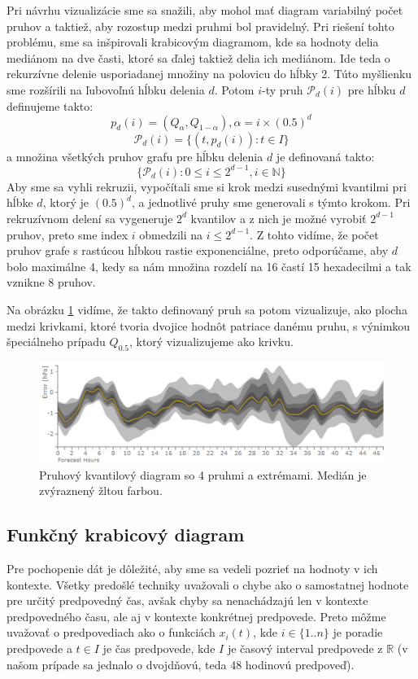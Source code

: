 Pri návrhu vizualizácie sme sa snažili, aby mohol mať diagram variabilný počet pruhov a taktiež, aby rozostup medzi pruhmi bol pravidelný. Pri riešení tohto problému, sme sa inšpirovali krabicovým diagramom, kde sa hodnoty delia mediánom na dve časti, ktoré sa ďalej taktiež delia ich mediánom. Ide teda o rekurzívne delenie usporiadanej množiny na polovicu do hĺbky 2. Túto myšlienku sme rozšírili na ľubovoľnú hĺbku delenia $ d $. Potom $ i $-ty pruh $ \mathcal{P}_{d}(i) $ pre hĺbku $ d $ definujeme takto:
\[
	p_{d}(i) = (Q_{\alpha},Q_{1 - \alpha}) , \alpha = i \times (0.5)^d 	
\]
\[
	\mathcal{P}_{d}(i) = \{ (t,p_{d}(i)) : t \in I \}
\]
a množina všetkých pruhov grafu pre hĺbku delenia $ d $ je definovaná takto:
\[
	\{ \mathcal{P}_{d}(i) : 0 \leq i \leq 2^{d-1} , i \in \mathbb{N} \}
\]
Aby sme sa vyhli rekruzii, vypočítali sme si krok medzi susednými kvantilmi pri hĺbke $ d $, ktorý je $ (0.5)^d $, a jednotlivé pruhy sme generovali s týmto krokom. Pri rekruzívnom delení sa vygeneruje $ 2^d $ kvantilov a z nich je možné vyrobiť $ 2^{d - 1} $ pruhov, preto sme index $ i $ obmedzili na $ i \leq 2^{d-1} $. Z tohto vidíme, že počet pruhov grafe s rastúcou hĺbkou rastie exponenciálne, preto odporúčame, aby $ d $ bolo maximálne 4, kedy sa nám množina rozdelí na 16 častí 15 hexadecilmi a tak vznikne 8 pruhov.

Na obrázku \ref{fig:stripe} vidíme, že takto definovaný pruh sa potom vizualizuje, ako plocha medzi krivkami, ktoré tvoria dvojice hodnôt patriace danému pruhu, s výnimkou špeciálneho prípadu $ Q_{0.5} $, ktorý vizualizujeme ako krivku.


\begin{figure}
	\centering
	\includegraphics[width = 5.0in]{stripe}
	\caption{Pruhový kvantilový diagram so 4 pruhmi a extrémami. Medián je zvýraznený žltou farbou.}
	\label{fig:stripe}
\end{figure}

 


\subsection{Funkčný krabicový diagram}
Pre pochopenie dát je dôležité, aby sme sa vedeli pozrieť na hodnoty v ich kontexte. Všetky predošlé techniky uvažovali o chybe ako o samostatnej hodnote pre určitý predpovedný čas, avšak chyby sa nenachádzajú len v kontexte predpovedného času, ale aj v kontexte konkrétnej predpovede. Preto môžme uvažovať o predpovediach ako o funkciách $ x_{i}(t) $, kde $ i \in \{1..n\}$ je poradie predpovede a $ t \in I $ je čas predpovede, kde $ I $ je časový interval predpovede z $ \mathbb{R} $ (v našom prípade sa jednalo o dvojdňovú, teda 48 hodinovú predpoveď).

